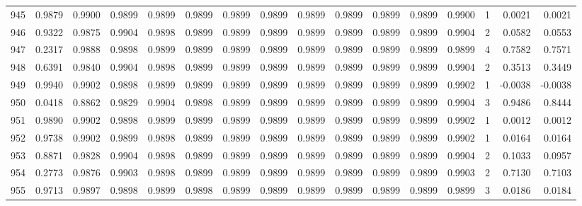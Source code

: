\begin{tabular}{lrrrrrrrrrrrrrrr}
945 &      0.9879 &  0.9900 &  0.9899 &  0.9899 &  0.9899 &  0.9899 &  0.9899 &  0.9899 &  0.9899 &  0.9899 &   0.9899 &     0.9900 &      1 &                    0.0021 &                     0.0021 \\
946 &      0.9322 &  0.9875 &  0.9904 &  0.9898 &  0.9899 &  0.9899 &  0.9899 &  0.9899 &  0.9899 &  0.9899 &   0.9899 &     0.9904 &      2 &                    0.0582 &                     0.0553 \\
947 &      0.2317 &  0.9888 &  0.9898 &  0.9899 &  0.9899 &  0.9899 &  0.9899 &  0.9899 &  0.9899 &  0.9899 &   0.9899 &     0.9899 &      4 &                    0.7582 &                     0.7571 \\
948 &      0.6391 &  0.9840 &  0.9904 &  0.9898 &  0.9899 &  0.9899 &  0.9899 &  0.9899 &  0.9899 &  0.9899 &   0.9899 &     0.9904 &      2 &                    0.3513 &                     0.3449 \\
949 &      0.9940 &  0.9902 &  0.9898 &  0.9899 &  0.9899 &  0.9899 &  0.9899 &  0.9899 &  0.9899 &  0.9899 &   0.9899 &     0.9902 &      1 &                   -0.0038 &                    -0.0038 \\
950 &      0.0418 &  0.8862 &  0.9829 &  0.9904 &  0.9898 &  0.9899 &  0.9899 &  0.9899 &  0.9899 &  0.9899 &   0.9899 &     0.9904 &      3 &                    0.9486 &                     0.8444 \\
951 &      0.9890 &  0.9902 &  0.9898 &  0.9899 &  0.9899 &  0.9899 &  0.9899 &  0.9899 &  0.9899 &  0.9899 &   0.9899 &     0.9902 &      1 &                    0.0012 &                     0.0012 \\
952 &      0.9738 &  0.9902 &  0.9899 &  0.9898 &  0.9899 &  0.9899 &  0.9899 &  0.9899 &  0.9899 &  0.9899 &   0.9899 &     0.9902 &      1 &                    0.0164 &                     0.0164 \\
953 &      0.8871 &  0.9828 &  0.9904 &  0.9898 &  0.9899 &  0.9899 &  0.9899 &  0.9899 &  0.9899 &  0.9899 &   0.9899 &     0.9904 &      2 &                    0.1033 &                     0.0957 \\
954 &      0.2773 &  0.9876 &  0.9903 &  0.9898 &  0.9899 &  0.9899 &  0.9899 &  0.9899 &  0.9899 &  0.9899 &   0.9899 &     0.9903 &      2 &                    0.7130 &                     0.7103 \\
955 &      0.9713 &  0.9897 &  0.9898 &  0.9899 &  0.9898 &  0.9899 &  0.9899 &  0.9899 &  0.9899 &  0.9899 &   0.9899 &     0.9899 &      3 &                    0.0186 &                     0.0184 \\

\end{tabular}
